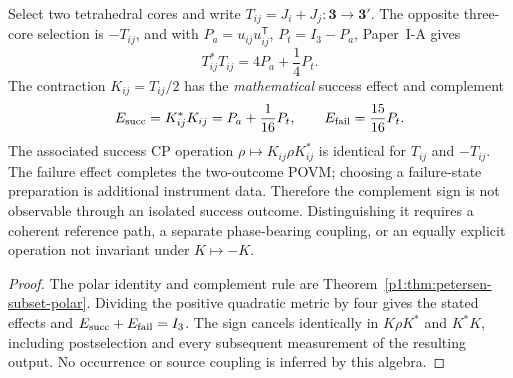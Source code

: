 \documentclass[12pt,a4paper]{article}
\begin{document}
\begin{theorem}
\label{p4a:thm:v320-complement-kraus-no-go}
Select two tetrahedral cores and write $T_{ij}=J_i+J_j:\mathbf3\to
\mathbf3'$. The opposite three-core selection is $-T_{ij}$,
and with $P_a=u_{ij}u_{ij}^{\mathsf T}$,
$P_t=I_3-P_a$, Paper~I-A gives
\[
 T_{ij}^*T_{ij}=4P_a+\frac14P_t.
\]
The contraction $K_{ij}=T_{ij}/2$ has the \emph{mathematical} success
effect and complement
\[
 E_{\rm succ}=K_{ij}^*K_{ij}=P_a+\frac1{16}P_t,
 \qquad E_{\rm fail}=\frac{15}{16}P_t.
\]
The associated success CP operation
$\rho\mapsto K_{ij}\rho K_{ij}^*$ is identical for $T_{ij}$ and
$-T_{ij}$. The failure effect completes the two-outcome POVM;
choosing a failure-state preparation is additional instrument data.
Therefore the complement sign is not observable through an isolated
success outcome. Distinguishing it requires a coherent reference path,
a separate phase-bearing coupling, or an equally explicit operation
not invariant under $K\mapsto-K$.
\end{theorem}
\begin{proof}
The polar identity and complement rule are
Theorem~\ref{p1:thm:petersen-subset-polar}. Dividing the positive
quadratic metric by four gives the stated effects and
$E_{\rm succ}+E_{\rm fail}=I_3$.
The sign cancels identically in $K\rho K^*$ and $K^*K$, including
postselection and every subsequent measurement of the resulting
output. No occurrence or source coupling is inferred by this algebra.
\end{proof}
\end{document}
